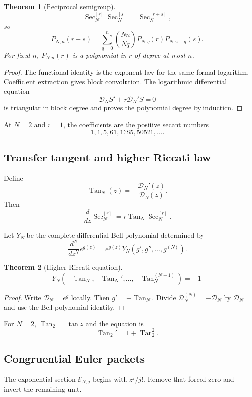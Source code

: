 \documentclass[11pt]{article}
\newtheorem{theorem}{Theorem}[section]\newtheorem{proposition}[theorem]{Proposition}\newtheorem{lemma}[theorem]{Lemma}\newtheorem{corollary}[theorem]{Corollary}
\theoremstyle{definition}\newtheorem{definition}[theorem]{Definition}\newtheorem{example}[theorem]{Example}\newtheorem{construction}[theorem]{Construction}\newtheorem{algorithm}[theorem]{Algorithm}\newtheorem{conjecture}[theorem]{Conjecture}\newtheorem{problem}[theorem]{Problem}
\theoremstyle{remark}\newtheorem{remark}[theorem]{Remark}\newtheorem{boundary}[theorem]{Boundary}\newtheorem{certificate}[theorem]{Computational Certificate}\newtheorem{classical}[theorem]{Classical Input}\newtheorem{principle}[theorem]{Structural Principle}
\begin{document}
\begin{theorem}[Reciprocal semigroup]
\[
 \operatorname{Sec}_N^{[r]}\operatorname{Sec}_N^{[s]}
 =\operatorname{Sec}_N^{[r+s]},
\]
so
\[
 \boxed{P_{N,n}(r+s)=\sum_{q=0}^{n}\binom{Nn}{Nq}P_{N,q}(r)P_{N,n-q}(s).}
\]
For fixed $n$, $P_{N,n}(r)$ is a polynomial in $r$ of degree at most $n$.
\end{theorem}
\begin{proof}
The functional identity is the exponent law for the same formal logarithm.  Coefficient extraction gives block convolution.  The logarithmic differential equation
\[
 \mathcal D_N S'+r\mathcal D_N'S=0
\]
is triangular in block degree and proves the polynomial degree by induction.
\end{proof}

At $N=2$ and $r=1$, the coefficients are the positive secant numbers
\[
 1,1,5,61,1385,50521,\ldots.
\]

\subsection{Transfer tangent and higher Riccati law}
Define
\[
 \boxed{\operatorname{Tan}_N(z)=-\frac{\mathcal D_N'(z)}{\mathcal D_N(z)}.}
\]
Then
\[
 \frac{d}{dz}\operatorname{Sec}_N^{[r]}
 =r\operatorname{Tan}_N\operatorname{Sec}_N^{[r]}.
\]

Let $Y_N$ be the complete differential Bell polynomial determined by
\[
 \frac{d^N}{dz^N}e^{g(z)}
 =e^{g(z)}Y_N(g',g'',\ldots,g^{(N)}).
\]

\begin{theorem}[Higher Riccati equation]
\[
 \boxed{Y_N(-\operatorname{Tan}_N,-\operatorname{Tan}_N',\ldots,-\operatorname{Tan}_N^{(N-1)})=-1.}
\]
\end{theorem}
\begin{proof}
Write $\mathcal D_N=e^g$ locally.  Then $g'=-\operatorname{Tan}_N$.  Divide $\mathcal D_N^{(N)}=-\mathcal D_N$ by $\mathcal D_N$ and use the Bell-polynomial identity.
\end{proof}

For $N=2$, $\operatorname{Tan}_2=\tan z$ and the equation is
\[
 \operatorname{Tan}_2'=1+\operatorname{Tan}_2^2.
\]

\subsection{Congruential Euler packets}
The exponential section $\mathcal E_{N,j}$ begins with $z^j/j!$.  Remove that forced zero and invert the remaining unit.
\end{document}

